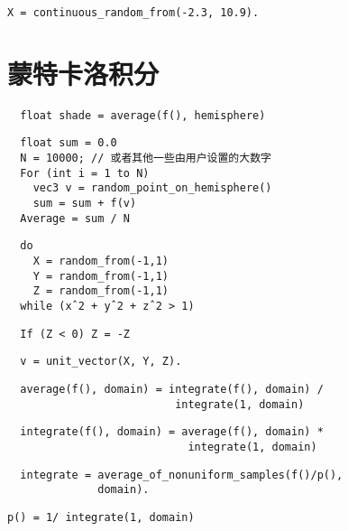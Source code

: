 \verb"X = continuous_random_from(-2.3, 10.9)."

\section{蒙特卡洛积分}

\begin{lstlisting}
  float shade = average(f(), hemisphere)
\end{lstlisting}

\begin{lstlisting}
  float sum = 0.0
  N = 10000; // 或者其他一些由用户设置的大数字
  For (int i = 1 to N)
    vec3 v = random_point_on_hemisphere()
    sum = sum + f(v)
  Average = sum / N
\end{lstlisting}

\begin{lstlisting}
  do
    X = random_from(-1,1)
    Y = random_from(-1,1)
    Z = random_from(-1,1)
  while (xˆ2 + yˆ2 + zˆ2 > 1)
\end{lstlisting}

\begin{lstlisting}
  If (Z < 0) Z = -Z
\end{lstlisting}

\begin{lstlisting}
  v = unit_vector(X, Y, Z).
\end{lstlisting}

\begin{lstlisting}
  average(f(), domain) = integrate(f(), domain) /
                          integrate(1, domain)
\end{lstlisting}

\begin{lstlisting}
  integrate(f(), domain) = average(f(), domain) *
                            integrate(1, domain)
\end{lstlisting}

\begin{lstlisting}
  integrate = average_of_nonuniform_samples(f()/p(),
              domain).
\end{lstlisting}

\verb"p() = 1/ integrate(1, domain)"

\begin{lstlisting}
  
\end{lstlisting}
